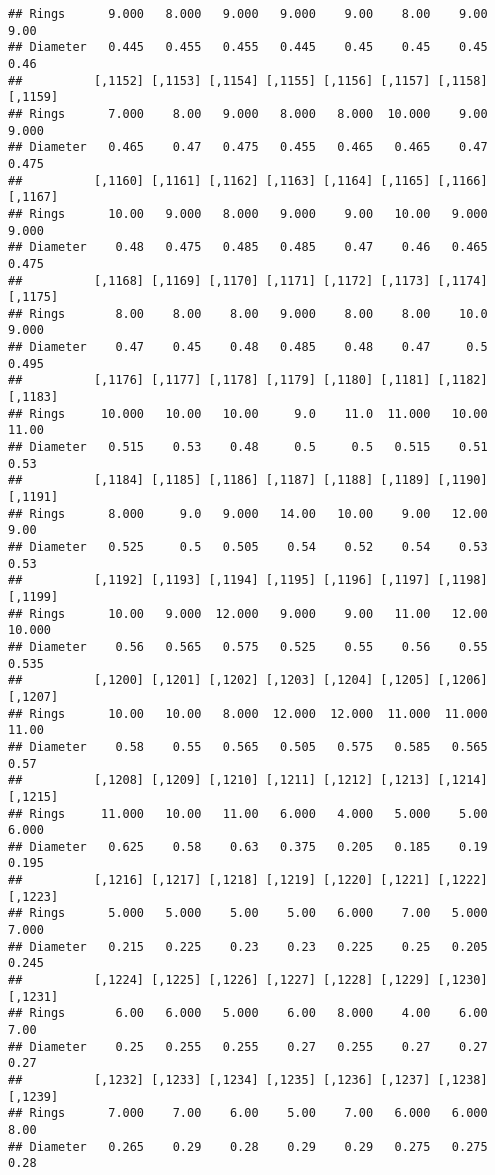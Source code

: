 \documentclass[
]{article}
\begin{document}
\begin{verbatim}
## Rings      9.000   8.000   9.000   9.000    9.00    8.00    9.00    9.00
## Diameter   0.445   0.455   0.455   0.445    0.45    0.45    0.45    0.46
##          [,1152] [,1153] [,1154] [,1155] [,1156] [,1157] [,1158] [,1159]
## Rings      7.000    8.00   9.000   8.000   8.000  10.000    9.00   9.000
## Diameter   0.465    0.47   0.475   0.455   0.465   0.465    0.47   0.475
##          [,1160] [,1161] [,1162] [,1163] [,1164] [,1165] [,1166] [,1167]
## Rings      10.00   9.000   8.000   9.000    9.00   10.00   9.000   9.000
## Diameter    0.48   0.475   0.485   0.485    0.47    0.46   0.465   0.475
##          [,1168] [,1169] [,1170] [,1171] [,1172] [,1173] [,1174] [,1175]
## Rings       8.00    8.00    8.00   9.000    8.00    8.00    10.0   9.000
## Diameter    0.47    0.45    0.48   0.485    0.48    0.47     0.5   0.495
##          [,1176] [,1177] [,1178] [,1179] [,1180] [,1181] [,1182] [,1183]
## Rings     10.000   10.00   10.00     9.0    11.0  11.000   10.00   11.00
## Diameter   0.515    0.53    0.48     0.5     0.5   0.515    0.51    0.53
##          [,1184] [,1185] [,1186] [,1187] [,1188] [,1189] [,1190] [,1191]
## Rings      8.000     9.0   9.000   14.00   10.00    9.00   12.00    9.00
## Diameter   0.525     0.5   0.505    0.54    0.52    0.54    0.53    0.53
##          [,1192] [,1193] [,1194] [,1195] [,1196] [,1197] [,1198] [,1199]
## Rings      10.00   9.000  12.000   9.000    9.00   11.00   12.00  10.000
## Diameter    0.56   0.565   0.575   0.525    0.55    0.56    0.55   0.535
##          [,1200] [,1201] [,1202] [,1203] [,1204] [,1205] [,1206] [,1207]
## Rings      10.00   10.00   8.000  12.000  12.000  11.000  11.000   11.00
## Diameter    0.58    0.55   0.565   0.505   0.575   0.585   0.565    0.57
##          [,1208] [,1209] [,1210] [,1211] [,1212] [,1213] [,1214] [,1215]
## Rings     11.000   10.00   11.00   6.000   4.000   5.000    5.00   6.000
## Diameter   0.625    0.58    0.63   0.375   0.205   0.185    0.19   0.195
##          [,1216] [,1217] [,1218] [,1219] [,1220] [,1221] [,1222] [,1223]
## Rings      5.000   5.000    5.00    5.00   6.000    7.00   5.000   7.000
## Diameter   0.215   0.225    0.23    0.23   0.225    0.25   0.205   0.245
##          [,1224] [,1225] [,1226] [,1227] [,1228] [,1229] [,1230] [,1231]
## Rings       6.00   6.000   5.000    6.00   8.000    4.00    6.00    7.00
## Diameter    0.25   0.255   0.255    0.27   0.255    0.27    0.27    0.27
##          [,1232] [,1233] [,1234] [,1235] [,1236] [,1237] [,1238] [,1239]
## Rings      7.000    7.00    6.00    5.00    7.00   6.000   6.000    8.00
## Diameter   0.265    0.29    0.28    0.29    0.29   0.275   0.275    0.28

\end{verbatim}
\end{document}
